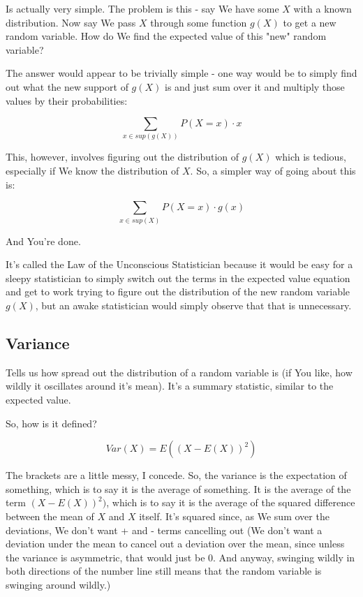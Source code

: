 \documentclass{article}
\begin{document}
		Is actually very simple. The problem is this - say We have some $X$ with a known distribution. Now say We pass $X$ through some function $g(X)$ to get a new random variable. How do We find the expected value of this "new" random variable?
		
		The answer would appear to be trivially simple - one way would be to simply find out what the new support of $g(X)$ is and just sum over it and multiply those values by their probabilities:
		
		$$\sum_{x \in sup(g(X))} P(X = x)\cdot x$$
		
		This, however, involves figuring out the distribution of $g(X)$ which is tedious, especially if We know the distribution of $X$. So, a simpler way of going about this is:
		
		$$\sum_{x \in sup(X)} P(X = x) \cdot g(x)$$
		
		And You're done. 
		
		It's called the Law of the Unconscious Statistician because it would be easy for a sleepy statistician to simply switch out the terms in the expected value equation and get to work trying to figure out the distribution of the new random variable $g(X)$, but an awake statistician would simply observe that that is unnecessary.
		
	\subsection{Variance}
	
		Tells us how spread out the distribution of a random variable is (if You like, how wildly it oscillates around it's mean). It's a summary statistic, similar to the expected value.
		
		So, how is it defined?
		
		$$Var(X) = E((X - E(X))^2)$$
		
		The brackets are a little messy, I concede. So, the variance is the expectation of something, which is to say it is the average of something. It is the average of the term $(X - E(X))^2)$, which is to say it is the average of the squared difference between the mean of $X$ and $X$ itself. It's squared since, as We sum over the deviations, We don't want + and - terms cancelling out (We don't want a deviation under the mean to cancel out a deviation over the mean, since unless the variance is asymmetric, that would just be 0. And anyway, swinging wildly in both directions of the number line still means that the random variable is swinging around wildly.)
		
\end{document}
